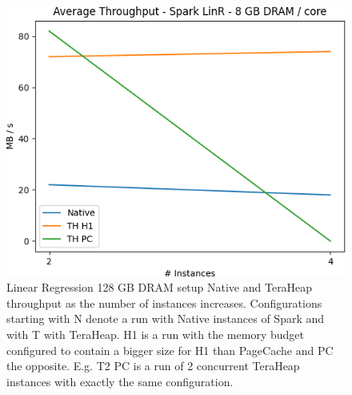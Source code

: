 \begin{figure}[thbp]
	\centering

        \includegraphics[width=\linewidth]{./fig/LINR_128_THR.png}
    \caption{Linear Regression 128 GB DRAM setup Native and TeraHeap
    throughput as the number of instances increases. Configurations
    starting with N denote a run with Native instances of Spark and
    with T with TeraHeap. H1 is a run with the memory budget
    configured to contain a bigger size for H1 than PageCache and PC
    the opposite. E.g. T2 PC is a run of 2 concurrent TeraHeap
    instances with exactly the same configuration.}
        \label{fig:linr_128_thr}
\end{figure}

